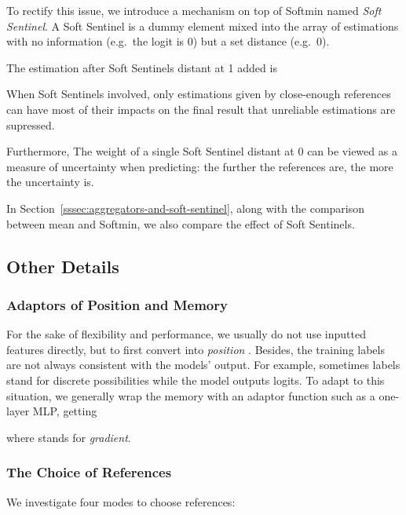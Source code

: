 \documentclass{article}
\begin{document}
To rectify this issue, we introduce a mechanism on top of Softmin named
\emph{Soft Sentinel}. A Soft Sentinel is a dummy element mixed into the
array of estimations with no information (e.g.~the logit is 0) but a set
distance (e.g.~0).

The estimation after  Soft Sentinels distant at 1 added is 

When Soft Sentinels involved, only estimations given by close-enough
references can have most of their impacts on the final result that unreliable
estimations are supressed.

Furthermore, The weight of a single Soft Sentinel distant at 0 can be
viewed as a measure of uncertainty when predicting: the further the
references are, the more the uncertainty is.

In Section~\ref{sssec:aggregators-and-soft-sentinel}, along with the
comparison between mean and Softmin, we also compare the effect of Soft Sentinels.

\hypertarget{other-details}{\subsection{Other Details}\label{ssec:other-details}}

\hypertarget{adaptors-of-position-and-memory}{\subsubsection{Adaptors of Position and Memory}\label{sssec:adaptors-of-position-and-memory}}

For the sake of flexibility and performance, we usually do not use
inputted features  directly, but to first convert  into
\emph{position} . Besides, the
training labels are not always consistent with the models' output. For
example, sometimes labels stand for discrete possibilities while the model outputs
logits. To adapt to this situation, we generally wrap the memory with an
adaptor function  such as a one-layer MLP, getting

where  stands for \emph{gradient}.

\hypertarget{the-choice-of-references}{\subsubsection{The Choice of References}\label{sssec:the-choice-of-references}}

We investigate four modes to choose references:
\end{document}
